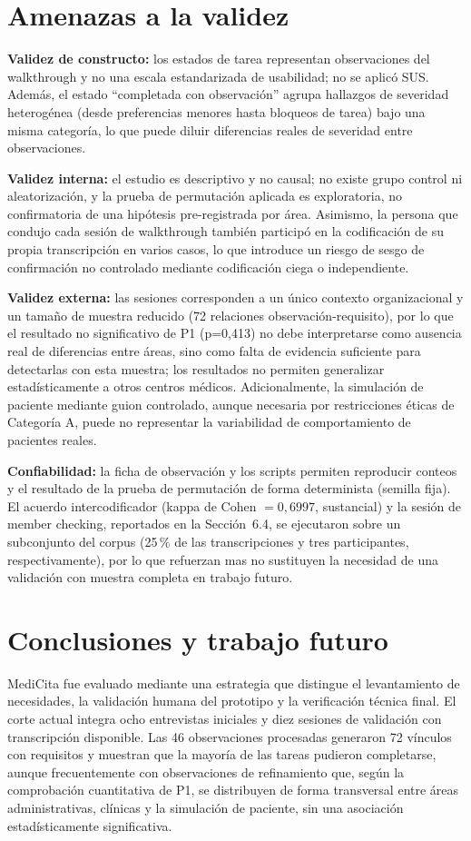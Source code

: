 \documentclass[runningheads]{llncs}
\begin{document}
	\section{Amenazas a la validez}
	\textbf{Validez de constructo:} los estados de tarea representan observaciones del walkthrough y no una escala estandarizada de usabilidad; no se aplicó SUS. Además, el estado ``completada con observación'' agrupa hallazgos de severidad heterogénea (desde preferencias menores hasta bloqueos de tarea) bajo una misma categoría, lo que puede diluir diferencias reales de severidad entre observaciones.
	
	\textbf{Validez interna:} el estudio es descriptivo y no causal; no existe grupo control ni aleatorización, y la prueba de permutación aplicada es exploratoria, no confirmatoria de una hipótesis pre-registrada por área. Asimismo, la persona que condujo cada sesión de walkthrough también participó en la codificación de su propia transcripción en varios casos, lo que introduce un riesgo de sesgo de confirmación no controlado mediante codificación ciega o independiente.
	
	\textbf{Validez externa:} las sesiones corresponden a un único contexto organizacional y un tamaño de muestra reducido (72 relaciones observación-requisito), por lo que el resultado no significativo de P1 (p=0,413) no debe interpretarse como ausencia real de diferencias entre áreas, sino como falta de evidencia suficiente para detectarlas con esta muestra; los resultados no permiten generalizar estadísticamente a otros centros médicos. Adicionalmente, la simulación de paciente mediante guion controlado, aunque necesaria por restricciones éticas de Categoría A, puede no representar la variabilidad de comportamiento de pacientes reales.
	
	\textbf{Confiabilidad:} la ficha de observación y los scripts permiten reproducir conteos y el resultado de la prueba de permutación de forma determinista (semilla fija). El acuerdo intercodificador (kappa de Cohen $=0{,}6997$, sustancial) y la sesión de member checking, reportados en la Sección~6.4, se ejecutaron sobre un subconjunto del corpus (25\,\% de las transcripciones y tres participantes, respectivamente), por lo que refuerzan mas no sustituyen la necesidad de una validación con muestra completa en trabajo futuro.
	
	\section{Conclusiones y trabajo futuro}
	MediCita fue evaluado mediante una estrategia que distingue el levantamiento de necesidades, la validación humana del prototipo y la verificación técnica final. El corte actual integra ocho entrevistas iniciales y diez sesiones de validación con transcripción disponible. Las 46 observaciones procesadas generaron 72 vínculos con requisitos y muestran que la mayoría de las tareas pudieron completarse, aunque frecuentemente con observaciones de refinamiento que, según la comprobación cuantitativa de P1, se distribuyen de forma transversal entre áreas administrativas, clínicas y la simulación de paciente, sin una asociación estadísticamente significativa.
	
\end{document}
